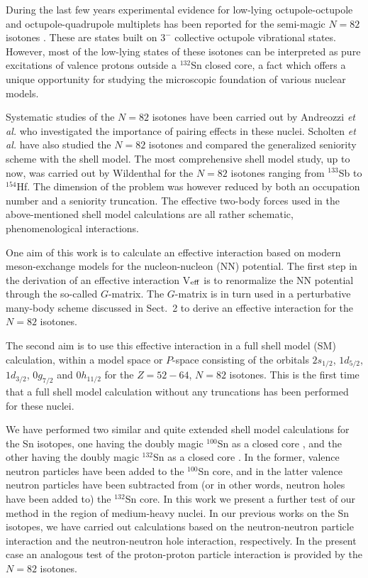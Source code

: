 During the last few years experimental evidence for 
low-lying octupole-octupole
and octupole-quadrupole multiplets has been reported 
for the semi-magic $N=82$ 
isotones \cite{bbd89,phk90,gvb90,gjb93}. 
These are states built on $3^{-}$ collective
octupole vibrational states.
However, most of the low-lying states of these isotones can be interpreted as 
pure excitations of valence protons outside a $^{132}$Sn closed core, 
a fact which 
offers a unique opportunity for studying the microscopic foundation of 
various nuclear models. 

Systematic studies of the $N=82$ isotones have been carried out by Andreozzi 
{\sl et al.} \cite{acgp90} who investigated the importance of pairing effects 
in these nuclei. Scholten {\sl et al.} \cite{sk83,ssbw87,swd89} have also 
studied the $N=82$ isotones and compared the generalized seniority 
scheme with the shell model. The most comprehensive shell model study, up to
now, was carried out by Wildenthal \cite{w90} for the $N=82$ isotones ranging
from $^{133}$Sb to $^{154}$Hf. The dimension of the 
problem was however reduced 
by both an occupation number and a seniority truncation. The 
effective two-body forces used in the above-mentioned 
shell model calculations 
are all rather schematic, phenomenological interactions.

One aim  of this work is to calculate an effective interaction based on
modern meson-exchange models for the nucleon-nucleon (NN) potential. 
The first step in the derivation of an effective interaction 
V$_{\rm eff}$ is to renormalize
the NN potential through the so-called $G$-matrix. The $G$-matrix is in turn
used in a perturbative many-body scheme discussed in Sect.\ 2  
to derive
an effective interaction for the $N=82$ isotones.

The second aim is to use this effective interaction 
in a full shell model (SM) calculation, 
within a model space or $P$-space consisting 
of the orbitals $2s_{1/2}$, $1d_{5/2}$, $1d_{3/2}$, $0g_{7/2}$ and $0h_{11/2}$ 
for the $Z=52 - 64$, $N=82$ isotones. This is the first time that a full shell
model calculation without any truncations has been performed for these
nuclei.

We have performed two similar and quite extended shell model calculations for 
the Sn isotopes, one having the doubly magic $^{100}$Sn as a closed core 
\cite{ehho95}, and  the other having the doubly magic $^{132}$Sn as a closed 
core \cite{ehhko95}. In the former, valence neutron particles have been added 
to the $^{100}$Sn core, and in the latter valence neutron particles have been 
subtracted from (or in other words, neutron holes have been added to)
the $^{132}$Sn core. In this work we present a further test of our 
method in the region of medium-heavy nuclei. In our previous works
on the Sn isotopes, we have carried out calculations based on the
neutron-neutron particle interaction and the neutron-neutron hole
interaction, respectively. In the present case an analogous test of the 
proton-proton particle interaction is provided by the $N=82$ isotones.


